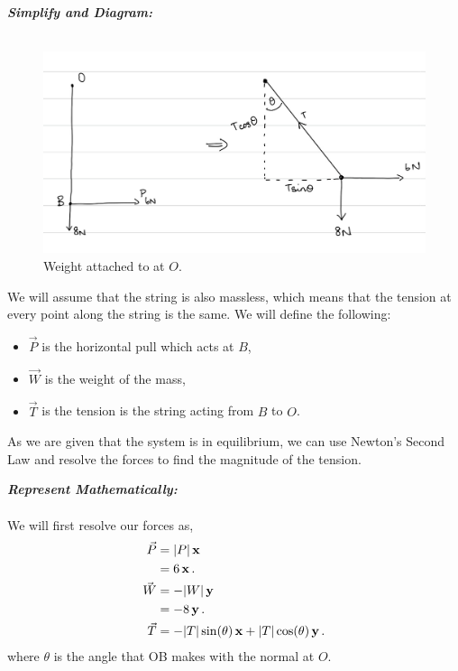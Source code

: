 \begin{subquestions}
\begin{subsubquestions}
\textbf{\textit{Simplify and Diagram:}} \\ \\
\begin{figure}[H]
	\begin{center}
		\includegraphics[scale=0.25]{../2010/figures/2010q6-1}
		\caption{\label{2010:q6:DIagram1} Weight attached to at $O$.}
	\end{center}
\end{figure}
We will assume that the string is also massless, which means that the tension at every point along the string is the same. We will define the following:
\begin{itemize}
	\item $\vec{P}$ is the horizontal pull which acts at $B$,
	\item $\vec{W}$ is the weight of the mass,
	\item $\vec{T}$ is the tension is the string acting from $B$ to $O$.
\end{itemize}
As we are given that the system is in equilibrium, we can use Newton's Second Law and resolve the forces to find the magnitude of the tension. 




\textbf{\textit{Represent Mathematically:}} \\ \\
We will first resolve our forces as,
\begin{align}
	\vec{P} & = |P|\,\mathbf{x} \nonumber \\
	        & = 6\,\mathbf{x} \,. \\
	\vec{W} & = -|W|\,\mathbf{y} \nonumber \\
	        & = -8\,\mathbf{y} \,. \\ 
	\vec{T} & = -|T|\sin(\theta)\,\mathbf{x} + |T|\cos(\theta)\,\mathbf{y} \,.
\end{align}
where $\theta$ is the angle that OB makes with the normal at $O$.


\end{subsubquestions}
\end{subquestions}
